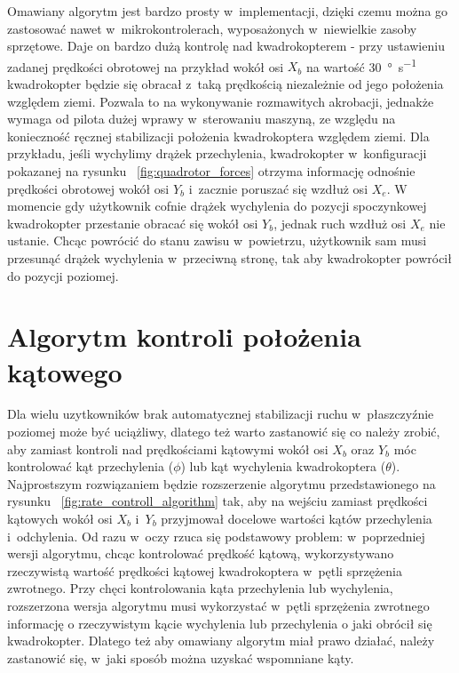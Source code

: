 \documentclass[11pt, twoside]{Thesis} %
\begin{document}
Omawiany algorytm jest bardzo prosty w~implementacji, dzięki czemu można go zastosować nawet w~mikrokontrolerach, wyposażonych w~niewielkie zasoby sprzętowe. Daje on bardzo dużą kontrolę nad kwadrokopterem - przy ustawieniu zadanej prędkości obrotowej na przykład wokół osi $X_b$ na wartość \SI{30}{\degree\per\second} kwadrokopter będzie się obracał z~taką prędkością niezależnie od jego położenia względem ziemi. Pozwala to na wykonywanie rozmawitych akrobacji, jednakże wymaga od pilota dużej wprawy w~sterowaniu maszyną, ze względu na konieczność ręcznej stabilizacji położenia kwadrokoptera względem ziemi. Dla przykładu, jeśli wychylimy drążek przechylenia, kwadrokopter w~konfiguracji pokazanej na rysunku  ~\ref{fig:quadrotor_forces} otrzyma informację odnośnie prędkości obrotowej wokół osi $Y_b$ i~zacznie poruszać się wzdłuż osi $X_e$. W momencie gdy użytkownik cofnie drążek wychylenia do pozycji spoczynkowej kwadrokopter przestanie obracać się  wokół osi $Y_b$, jednak ruch wzdłuż osi $X_e$ nie ustanie. Chcąc powrócić do stanu zawisu w~powietrzu, użytkownik sam musi przesunąć drążek wychylenia w~przeciwną stronę, tak aby kwadrokopter powrócił do pozycji poziomej. 

\section{Algorytm kontroli położenia kątowego}

Dla wielu uzytkowników brak automatycznej stabilizacji ruchu w~płaszczyźnie poziomej może być uciążliwy, dlatego też warto zastanowić się co należy zrobić, aby zamiast kontroli nad prędkościami kątowymi wokół osi $X_b$ oraz $Y_b$ móc kontrolować kąt przechylenia ($\phi$) lub kąt wychylenia kwadrokoptera ($\theta$). Najprostszym rozwiązaniem będzie rozszerzenie algorytmu przedstawionego na rysunku ~\ref{fig:rate_controll_algorithm} tak, aby na wejściu zamiast prędkości kątowych wokół osi $X_b$ i~$Y_b$ przyjmował docelowe wartości kątów przechylenia i~odchylenia. Od razu w~oczy rzuca się podstawowy problem: w~poprzedniej wersji algorytmu, chcąc kontrolować prędkość kątową, wykorzystywano rzeczywistą wartość prędkości kątowej kwadrokoptera w~pętli sprzężenia zwrotnego. Przy chęci kontrolowania kąta przechylenia lub wychylenia, rozszerzona wersja algorytmu musi wykorzystać w~pętli sprzężenia zwrotnego informację o rzeczywistym kącie wychylenia lub przechylenia o jaki obrócił się kwadrokopter. Dlatego też aby omawiany algorytm miał prawo działać, należy zastanowić się, w~jaki sposób można uzyskać wspomniane kąty.  
\end{document}
